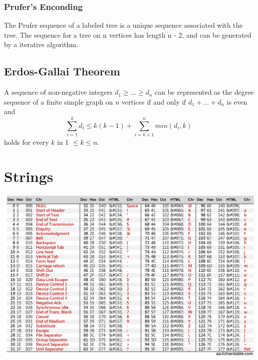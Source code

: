 \documentclass[10pt, twocolumn]{article}
\begin{document}
\begin{flushleft}
\subsubsection{Prufer's Enconding}
The Prufer sequence of a labeled tree is a unique sequence associated with the tree. The sequence for a tree on n vertices has length n - 2, and can be generated by a iterative algorithm.

\subsection{Erdos-Gallai Theorem}
A sequence of non-negative integers $d_1 \geq ... \geq d_n$ can be represented as the degree sequence of a finite simple graph on $n$ vertices if and only if $d_1 + ... + d_n$ is even and
$$\sum_{i=1}^{k} d_i \leq k(k-1) + \sum_{i=k+1}^{n} min(d_i, k)$$
holds for every $k$ in 1 $\leq k \leq n$.



\section{Strings}

\begin{center}
\includegraphics[scale=0.122]{ASCII-Table-wide.jpg}
\end{center}




\end{flushleft}
\end{document}
